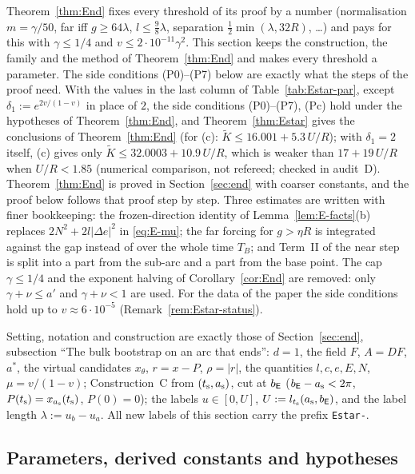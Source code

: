Theorem~\ref{thm:End} fixes every threshold of its proof by a number (normalisation $m=\gamma/50$, far iff $g\ge64\lambda$,
$l\le\frac98\lambda$, separation $\frac12\min(\lambda,32R)$, \dots) and pays for this with $\gamma\le1/4$ and
$v\le2\cdot10^{-11}\gamma^2$. This section keeps the construction, the family and the method of Theorem~\ref{thm:End} and makes
every threshold a parameter. The side conditions \textup{(P0)}--\textup{(P7)} below are exactly what the steps of the proof need.
With the values in the last column of Table~\ref{tab:Estar-par}, except $\delta_1:=e^{2v/(1-v)}$ in place of $2$, the side
conditions \textup{(P0)}--\textup{(P7)}, \textup{(Pc)} hold under the hypotheses of Theorem~\ref{thm:End}, and
Theorem~\ref{thm:Estar} gives the conclusions of Theorem~\ref{thm:End} (for (c): $\tilde K\le16.001+5.3\,U/R$); with $\delta_1=2$
itself, (c) gives only $\tilde K\le32.0003+10.9\,U/R$, which is weaker than $17+19\,U/R$ when $U/R<1.85$ (numerical comparison, not
refereed; checked in audit~D). Theorem~\ref{thm:End} is proved in Section~\ref{sec:end} with coarser constants, and the proof below
follows that proof step by step. Three
estimates are written with finer bookkeeping: the frozen-direction identity of Lemma~\ref{lem:E-facts}(b) replaces
$2N^2+2l|\Delta e|^2$ in \eqref{eq:E-mu}; the far forcing for $g>\eta R$ is integrated against the gap instead of over the
whole time $T_B$; and Term~II of the near step is split into a part from the sub-arc and a part from the base point. The cap
$\gamma\le1/4$ and the exponent halving of Corollary~\ref{cor:End} are removed: only $\gamma+\nu\le a'$ and $\gamma+\nu<1$ are
used. For the data of the paper the side conditions hold up to $v\approx6\cdot10^{-5}$ (Remark~\ref{rem:Estar-status}).

Setting, notation and construction are exactly those of Section~\ref{sec:end}, subsection ``The bulk bootstrap on an arc that
ends'': $d=1$, the field $F$, $A=DF$, $a^*$, the virtual candidates $x_\theta$, $r=x-P$, $\rho=|r|$, the quantities $l,c,e,E,N$,
$\mu=v/(1-v)$; Construction~C from $(t_{\mathrm s},a_{\mathrm s})$, cut at $b_{\mathsf E}$ ($b_{\mathsf E}-a_{\mathrm s}<2\pi$,
$P(t_{\mathrm s})=x_{a_{\mathrm s}}(t_{\mathrm s})$, $P(0)=0$); the labels $u\in[0,U]$, $U:=l_{t_{\mathrm s}}(a_{\mathrm s},b_{\mathsf E})$, and the label length
$\lambda:=u_b-u_a$. All new labels of this section carry the prefix \texttt{Estar-}.

\subsection{Parameters, derived constants and hypotheses}

